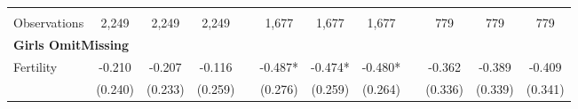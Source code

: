 \begin{landscape}
\begin{table}[htpb!]
\begin{center}
\begin{tabular}{lcccp{2mm}cccp{2mm}ccc}
\begin{footnotesize}\end{footnotesize}&\begin{footnotesize}\end{footnotesize}&\begin{footnotesize}\end{footnotesize}&\begin{footnotesize}\end{footnotesize}&\begin{footnotesize}\end{footnotesize}&\begin{footnotesize}\end{footnotesize}&\begin{footnotesize}\end{footnotesize}&\begin{footnotesize}\end{footnotesize}&\begin{footnotesize}\end{footnotesize}&\begin{footnotesize}\end{footnotesize}&\begin{footnotesize}\end{footnotesize}&\begin{footnotesize}\end{footnotesize}\\Observations&2,249&2,249&2,249&&1,677&1,677&1,677&&779&779&779\\
\multicolumn{12}{l}{\textbf{Girls OmitMissing}}\\ 
Fertility&-0.210&-0.207&-0.116&&-0.487*&-0.474*&-0.480*&&-0.362&-0.389&-0.409\\
&(0.240)&(0.233)&(0.259)&&(0.276)&(0.259)&(0.264)&&(0.336)&(0.339)&(0.341)\\

\end{tabular}
\end{center}
\end{table}
\end{landscape}
